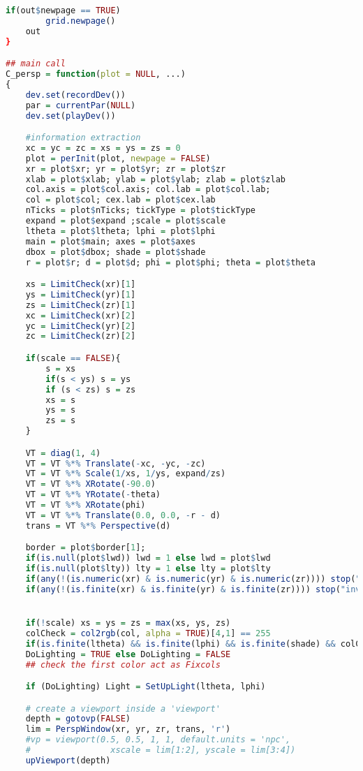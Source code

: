 \begin{lstlisting}[language = R]
    if(out$newpage == TRUE)
        grid.newpage()
    out
}

## main call 
C_persp = function(plot = NULL, ...)
{
    dev.set(recordDev())
    par = currentPar(NULL)
    dev.set(playDev())

    #information extraction
    xc = yc = zc = xs = ys = zs = 0
    plot = perInit(plot, newpage = FALSE)
    xr = plot$xr; yr = plot$yr; zr = plot$zr
    xlab = plot$xlab; ylab = plot$ylab; zlab = plot$zlab
    col.axis = plot$col.axis; col.lab = plot$col.lab; 
    col = plot$col; cex.lab = plot$cex.lab
    nTicks = plot$nTicks; tickType = plot$tickType
    expand = plot$expand ;scale = plot$scale
    ltheta = plot$ltheta; lphi = plot$lphi
    main = plot$main; axes = plot$axes
    dbox = plot$dbox; shade = plot$shade
    r = plot$r; d = plot$d; phi = plot$phi; theta = plot$theta

    xs = LimitCheck(xr)[1]
    ys = LimitCheck(yr)[1]
    zs = LimitCheck(zr)[1]
    xc = LimitCheck(xr)[2]
    yc = LimitCheck(yr)[2]
    zc = LimitCheck(zr)[2]

    if(scale == FALSE){
        s = xs
        if(s < ys) s = ys
        if (s < zs) s = zs
        xs = s
        ys = s
        zs = s
    }

    VT = diag(1, 4)
    VT = VT %*% Translate(-xc, -yc, -zc)
    VT = VT %*% Scale(1/xs, 1/ys, expand/zs)
    VT = VT %*% XRotate(-90.0)
    VT = VT %*% YRotate(-theta)
    VT = VT %*% XRotate(phi)
    VT = VT %*% Translate(0.0, 0.0, -r - d)
    trans = VT %*% Perspective(d)

    border = plot$border[1];
    if(is.null(plot$lwd)) lwd = 1 else lwd = plot$lwd
    if(is.null(plot$lty)) lty = 1 else lty = plot$lty
    if(any(!(is.numeric(xr) & is.numeric(yr) & is.numeric(zr)))) stop("invalid limits")
    if(any(!(is.finite(xr) & is.finite(yr) & is.finite(zr)))) stop("invalid limits")


    if(!scale) xs = ys = zs = max(xs, ys, zs)
    colCheck = col2rgb(col, alpha = TRUE)[4,1] == 255
    if(is.finite(ltheta) && is.finite(lphi) && is.finite(shade) && colCheck)
    DoLighting = TRUE else DoLighting = FALSE
    ## check the first color act as Fixcols

    if (DoLighting) Light = SetUpLight(ltheta, lphi)

    # create a viewport inside a 'viewport'
    depth = gotovp(FALSE)
    lim = PerspWindow(xr, yr, zr, trans, 'r')
    #vp = viewport(0.5, 0.5, 1, 1, default.units = 'npc',
    #                xscale = lim[1:2], yscale = lim[3:4])
    upViewport(depth)


\end{lstlisting}
